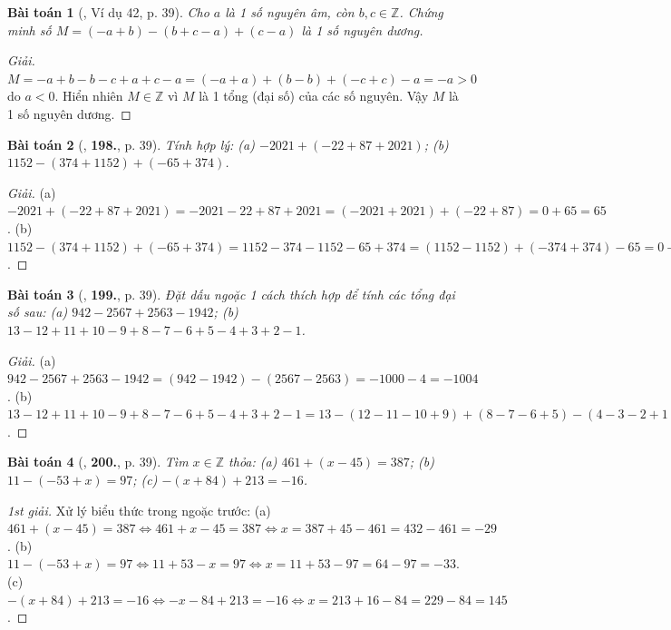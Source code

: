 \documentclass{article}
\numberwithin{equation}{section}
\newtheorem{baitoan}{Bài toán}
\begin{document}
\begin{baitoan}[\cite{Tuyen_Toan_6}, Ví dụ 42, p. 39]
	Cho $a$ là 1 số nguyên âm, còn $b,c\in\mathbb{Z}$. Chứng minh số $M = (-a + b) - (b + c - a) + (c - a)$ là 1 số nguyên dương.
\end{baitoan}

\begin{proof}[Giải]
	$M = -a + b - b - c + a + c - a = (-a + a) + (b - b) + (-c + c) - a = -a > 0$ do $a < 0$. Hiển nhiên $M\in\mathbb{Z}$ vì $M$ là 1 tổng (đại số) của các số nguyên. Vậy $M$ là 1 số nguyên dương.
\end{proof}

\begin{baitoan}[\cite{Tuyen_Toan_6}, \textbf{198.}, p. 39]
	Tính hợp lý: (a) $-2021 + (-22 + 87 + 2021)$; (b) $1152 - (374 + 1152) + (-65 + 374)$.
\end{baitoan}

\begin{proof}[Giải]
	(a) $-2021 + (-22 + 87 + 2021) = -2021 - 22 + 87 + 2021 = (-2021 + 2021) + (-22 + 87) = 0 + 65 = 65$. (b) $1152 - (374 + 1152) + (-65 + 374) = 1152 - 374 - 1152 - 65 + 374 = (1152 - 1152) + (-374 + 374) - 65 = 0 + 0 - 65 = -65$.
\end{proof}

\begin{baitoan}[\cite{Tuyen_Toan_6}, \textbf{199.}, p. 39]
	Đặt dấu ngoặc 1 cách thích hợp để tính các tổng đại số sau: (a) $942 - 2567 + 2563 - 1942$; (b) $13 - 12 + 11 + 10 - 9 + 8 - 7 - 6 + 5 - 4 + 3 + 2 - 1$.
\end{baitoan}

\begin{proof}[Giải]
	(a) $942 - 2567 + 2563 - 1942 = (942 - 1942) - (2567 - 2563) = -1000 - 4 = -1004$. (b) $13 - 12 + 11 + 10 - 9 + 8 - 7 - 6 + 5 - 4 + 3 + 2 - 1 = 13 - (12 - 11 - 10 + 9) + (8 - 7 - 6 + 5) - (4 - 3 - 2 + 1) = 13 - 0 + 0 - 0 = 13$.
\end{proof}

\begin{baitoan}[\cite{Tuyen_Toan_6}, \textbf{200.}, p. 39]
	Tìm $x\in\mathbb{Z}$ thỏa: (a) $461 + (x - 45) = 387$; (b) $11 - (-53 + x) = 97$; (c) $-(x + 84) + 213 = -16$.
\end{baitoan}

\begin{proof}[1st giải]
	Xử lý biểu thức trong ngoặc trước: (a) $461 + (x - 45) = 387\Leftrightarrow 461 + x - 45 = 387\Leftrightarrow x = 387 + 45 - 461 = 432 - 461 = -29$. (b) $11 - (-53 + x) = 97\Leftrightarrow 11 + 53 - x = 97\Leftrightarrow x = 11 + 53 - 97 = 64 - 97 = -33$. (c) $-(x + 84) + 213 = -16\Leftrightarrow-x - 84 + 213 = -16\Leftrightarrow x = 213 + 16 - 84 = 229 - 84 = 145$.
\end{proof}
\end{document}
